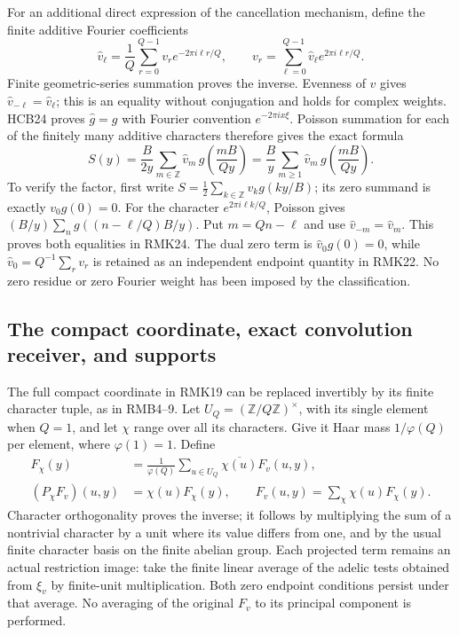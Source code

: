 \documentclass[11pt]{article}
\begin{document}
For an additional direct expression of the cancellation mechanism,
define the finite additive Fourier coefficients
\begin{equation}\tag{RMK23}
 \widehat v_\ell=\frac1Q\sum_{r=0}^{Q-1}
       v_r e^{-2\pi i\ell r/Q},\qquad
 v_r=\sum_{\ell=0}^{Q-1}\widehat v_\ell e^{2\pi i\ell r/Q}.
\end{equation}
Finite geometric-series summation proves the inverse. Evenness of
$v$ gives $\widehat v_{-\ell}=\widehat v_\ell$; this is an equality
without conjugation and holds for complex weights. HCB24 proves
$\widehat g=g$ with Fourier convention $e^{-2\pi i x\xi}$.
Poisson summation for each of the finitely many additive characters
therefore gives the exact formula
\begin{equation}\tag{RMK24}
 S(y)=\frac{B}{2y}\sum_{m\in\mathbb Z}
       \widehat v_m\,g\left(\frac{mB}{Qy}\right)
     =\frac By\sum_{m\geq1}
       \widehat v_m\,g\left(\frac{mB}{Qy}\right).
\end{equation}
To verify the factor, first write $S=\frac12\sum_{k\in\mathbb Z}
v_kg(ky/B)$; its zero summand is exactly $v_0g(0)=0$.
For the character $e^{2\pi i\ell k/Q}$, Poisson gives
$(B/y)\sum_n g((n-\ell/Q)B/y)$. Put $m=Qn-\ell$ and use
$\widehat v_{-m}=\widehat v_m$. This proves both equalities in
RMK24. The dual zero term is $\widehat v_0g(0)=0$, while
$\widehat v_0=Q^{-1}\sum_rv_r$ is retained as an independent
endpoint quantity in RMK22. No zero residue or zero Fourier weight
has been imposed by the classification.

\subsection{The compact coordinate, exact convolution receiver, and supports}

The full compact coordinate in RMK19 can be replaced invertibly by
its finite character tuple, as in RMB4--9. Let $U_Q=(\mathbb Z/Q
\mathbb Z)^\times$, with its single element when $Q=1$, and let
$\chi$ range over all its characters. Give it Haar mass
$1/\varphi(Q)$ per element, where $\varphi(1)=1$. Define
\begin{equation}\tag{RMK25}
\begin{split}
 F_\chi(y)&=\frac1{\varphi(Q)}\sum_{u\in U_Q}
                \overline{\chi(u)}F_v(u,y),\\
 (P_\chi F_v)(u,y)&=\chi(u)F_\chi(y),\qquad
 F_v(u,y)=\sum_\chi\chi(u)F_\chi(y).
\end{split}
\end{equation}
Character orthogonality proves the inverse; it follows by multiplying
the sum of a nontrivial character by a unit where its value differs
from one, and by the usual finite character basis on the finite
abelian group. Each projected term remains an actual restriction
image: take the finite linear average of the adelic tests obtained
from $\xi_v$ by finite-unit multiplication. Both zero endpoint
conditions persist under that average. No averaging of the original
$F_v$ to its principal component is performed.
\end{document}

